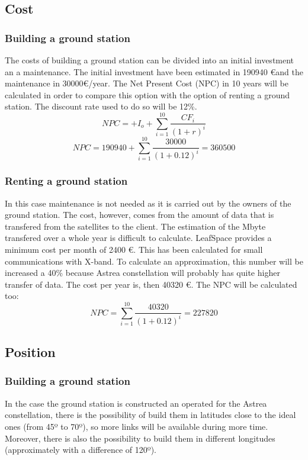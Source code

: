 \subsection{Cost}
\subsubsection{Building a ground station}
The costs of building a ground station can be divided into an initial investment an a maintenance. The initial investment have been estimated in 190940 \euro and the maintenance in 30000\euro /year. The Net Present Cost (NPC) in 10 years will be calculated in order to compare this option with the option of renting a ground station. The discount rate used to do so will be 12\%.
\begin{equation}
NPC=+I_{o}+\sum_{i=1}^{10} \frac{CF_{i}}{(1+r)^i}
\end{equation}
\begin{equation}
NPC=190940+\sum_{i=1}^{10} \frac{30000}{(1+0.12)^i}=360500
\end{equation}
\subsubsection{Renting a ground station}
In this case maintenance is not needed as it is carried out by the owners of the ground station. The cost, however, comes from the amount of data that is transfered from the satellites to the client. The estimation of the Mbyte transfered over a whole year is difficult to calculate. LeafSpace provides a minimum cost per month of 2400 \euro . This has been calculated for small communications  with X-band. To calculate an approximation, this number will be increased a 40\% because Astrea constellation will probably has quite higher transfer of data. The cost per year is, then 40320 \euro. The NPC will be calculated too: 
 \begin{equation}
NPC=\sum_{i=1}^{10} \frac{40320}{(1+0.12)^i}=227820 
\end{equation}
\subsection{Position}
\subsubsection{Building a ground station}
In the case the ground station is constructed an operated for the Astrea constellation, there is the possibility of build them in latitudes close to the ideal ones (from 45º to 70º), so more links will be available during more time. Moreover, there is also the possibility to build them in different longitudes (approximately with a difference of 120º). 

